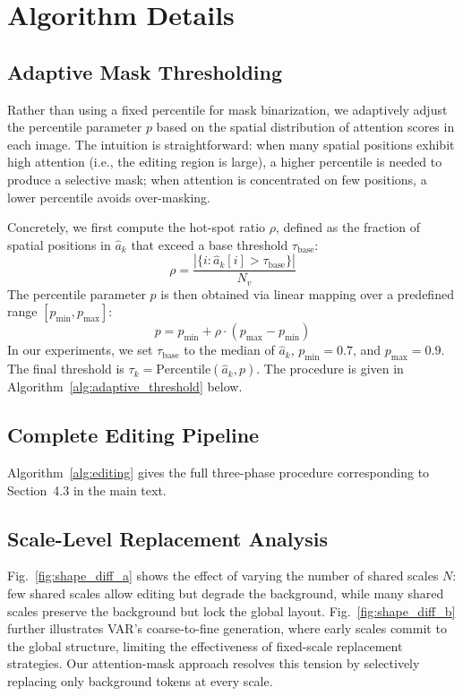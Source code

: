 \section{Algorithm Details}
\label{sec:supp_algorithms}

\subsection{Adaptive Mask Thresholding}
\label{sec:supp_adaptive_threshold}

Rather than using a fixed percentile for mask binarization, we adaptively adjust the percentile parameter $p$ based on the spatial distribution of attention scores in each image. The intuition is straightforward: when many spatial positions exhibit high attention (i.e., the editing region is large), a higher percentile is needed to produce a selective mask; when attention is concentrated on few positions, a lower percentile avoids over-masking.

Concretely, we first compute the hot-spot ratio $\rho$, defined as the fraction of spatial positions in $\hat{a}_k$ that exceed a base threshold $\tau_{\mathrm{base}}$:
\begin{equation}
    \rho = \frac{|\{i : \hat{a}_k[i] > \tau_{\mathrm{base}}\}|}{N_v}
\end{equation}
The percentile parameter $p$ is then obtained via linear mapping over a predefined range $[p_{\min}, p_{\max}]$:
\begin{equation}
    p = p_{\min} + \rho \cdot (p_{\max} - p_{\min})
\end{equation}
In our experiments, we set $\tau_{\mathrm{base}}$ to the median of $\hat{a}_k$, $p_{\min} = 0.7$, and $p_{\max} = 0.9$. The final threshold is $\tau_k = \mathrm{Percentile}(\hat{a}_k, p)$. The procedure is given in Algorithm~\ref{alg:adaptive_threshold} below.



\subsection{Complete Editing Pipeline}
\label{sec:supp_pipeline}

Algorithm~\ref{alg:editing} gives the full three-phase procedure corresponding to Section~4.3 in the main text.



\subsection{Scale-Level Replacement Analysis}
\label{sec:supp_shape_diff}



Fig.~\ref{fig:shape_diff_a} shows the effect of varying the number of shared scales $N$: few shared scales allow editing but degrade the background, while many shared scales preserve the background but lock the global layout. Fig.~\ref{fig:shape_diff_b} further illustrates VAR's coarse-to-fine generation, where early scales commit to the global structure, limiting the effectiveness of fixed-scale replacement strategies. Our attention-mask approach resolves this tension by selectively replacing only background tokens at every scale.
